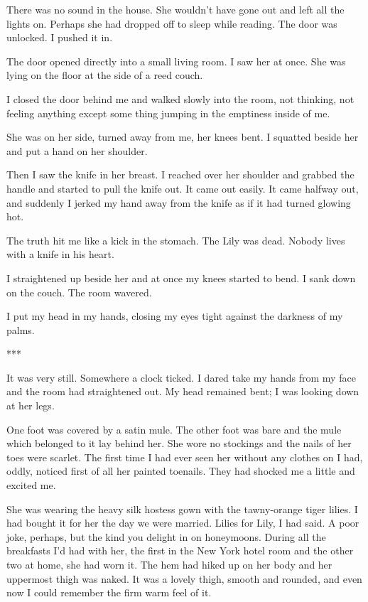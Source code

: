 \documentclass{novel}
\begin{document}
{There was no sound in the house. She wouldn’t have gone out and left all the lights on. Perhaps she had dropped off to sleep while reading. The door was unlocked. I pushed it in.

The door opened directly into a small living room. I saw her at once. She was lying on the floor at the side of a reed couch.

I closed the door behind me and walked slowly into the room, not thinking, not feeling anything except some thing jumping in the emptiness inside of me.

She was on her side, turned away from me, her knees bent. I squatted beside her and put a hand on her shoulder.

Then I saw the knife in her breast. I reached over her shoulder and grabbed the handle and started to pull the knife out. It came out easily. It came halfway out, and suddenly I jerked my hand away from the knife as if it had turned glowing hot.

The truth hit me like a kick in the stomach. The Lily was dead. Nobody lives with a knife in his heart.

I straightened up beside her and at once my knees started to bend. I sank down on the couch. The room wavered.

I put my head in my hands, closing my eyes tight against the darkness of my palms.

***

It was very still. Somewhere a clock ticked. I dared take my hands from my face and the room had straightened out. My head remained bent; I was looking down at her legs.

One foot was covered by a satin mule. The other foot was bare and the mule which belonged to it lay behind her. She wore no stockings and the nails of her toes were scarlet. The first time I had ever seen her without any clothes on I had, oddly, noticed first of all her painted toenails. They had shocked me a little and excited me.

She was wearing the heavy silk hostess gown with the tawny-orange tiger lilies. I had bought it for her the day we were married. Lilies for Lily, I had said. A poor joke, perhaps, but the kind you delight in on honeymoons. During all the breakfasts I’d had with her, the first in the New York hotel room and the other two at home, she had worn it. The hem had hiked up on her body and her uppermost thigh was naked. It was a lovely thigh, smooth and rounded, and even now I could remember the firm warm feel of it.

}
\end{document}
